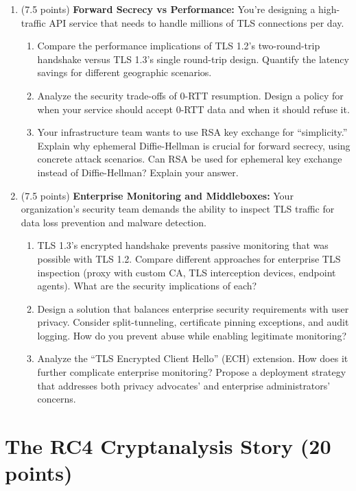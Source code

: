 \documentclass[10pt,a4paper,american]{article}
\begin{document}
\begin{enumerate}
	\item (7.5 points) \textbf{Forward Secrecy vs Performance:}
	      You're designing a high-traffic API service that needs to handle millions of TLS connections per day.
	      \begin{enumerate}
		      \item Compare the performance implications of TLS 1.2's two-round-trip handshake versus TLS 1.3's single round-trip design. Quantify the latency savings for different geographic scenarios.
		      \item Analyze the security trade-offs of 0-RTT resumption. Design a policy for when your service should accept 0-RTT data and when it should refuse it.
		      \item Your infrastructure team wants to use RSA key exchange for ``simplicity.'' Explain why ephemeral Diffie-Hellman is crucial for forward secrecy, using concrete attack scenarios. Can RSA be used for ephemeral key exchange instead of Diffie-Hellman? Explain your answer.
	      \end{enumerate}
	\item (7.5 points) \textbf{Enterprise Monitoring and Middleboxes:}
	      Your organization's security team demands the ability to inspect TLS traffic for data loss prevention and malware detection.
	      \begin{enumerate}
		      \item TLS 1.3's encrypted handshake prevents passive monitoring that was possible with TLS 1.2. Compare different approaches for enterprise TLS inspection (proxy with custom CA, TLS interception devices, endpoint agents). What are the security implications of each?
		      \item Design a solution that balances enterprise security requirements with user privacy. Consider split-tunneling, certificate pinning exceptions, and audit logging. How do you prevent abuse while enabling legitimate monitoring?
		      \item Analyze the ``TLS Encrypted Client Hello'' (ECH) extension. How does it further complicate enterprise monitoring? Propose a deployment strategy that addresses both privacy advocates' and enterprise administrators' concerns.
	      \end{enumerate}
\end{enumerate}

\section{The RC4 Cryptanalysis Story (20 points)}
\end{document}
